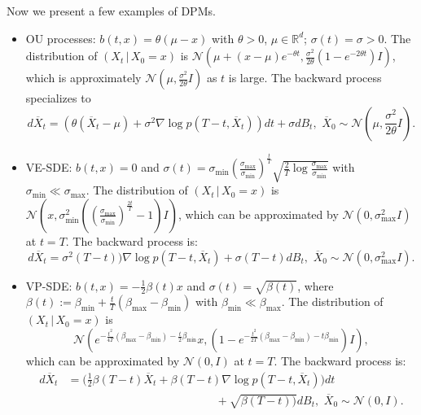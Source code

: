 \documentclass[letterpaper,11pt,reqno]{amsart}
\numberwithin{equation}{section}
\begin{document}
\quad Now we present a few examples of DPMs. 
\begin{itemize}[itemsep = 3 pt]
\item
OU processes: $b(t,x) = \theta (\mu - x)$ with $\theta > 0$, $\mu \in \mathbb{R}^d$; 
$\sigma(t) = \sigma > 0$.
The distribution of $(X_t \,|\, X_0 = x)$ is 
$\mathcal{N}(\mu + (x - \mu) e^{-\theta t}, \frac{\sigma^2}{2\theta} (1 - e^{-2 \theta t}) I)$,
which is approximately 
$\mathcal{N}(\mu, \frac{\sigma^2}{2 \theta} I)$ as $t$ is large.
The backward process specializes to
\begin{equation}
\label{eq:OUrev2}
d\overline{X}_t = (\theta(\overline{X}_t - \mu) + \sigma^2 \nabla \log p(T-t, \overline{X}_t)) dt  + \sigma dB_t, 
\,\, \overline{X}_0 \sim \mathcal{N}\left(\mu, \frac{\sigma^2}{2 \theta} I\right).
\end{equation}
\item
VE-SDE:
$b(t,x) = 0$ and 
$\sigma(t) = \sigma_{\min} \left(\frac{\sigma_{\max}}{\sigma_{\min}} \right)^{\frac{t}{T}} \sqrt{\frac{2}{T} \log \frac{\sigma_{\max}}{\sigma_{\min}}}$
with 
$\sigma_{\min} \ll  \sigma_{\max}$.
The distribution of $(X_t \,|\, X_0 = x)$ is $\mathcal{N}\left(x, \sigma^2_{\min}\left( \left(\frac{\sigma_{\max}}{\sigma_{\min}} \right)^{\frac{2t}{T}}- 1 \right) I \right)$, 
which can be approximated by $\mathcal{N}(0, \sigma^2_{\max} I)$ at $t = T$.
The backward process is:
\begin{equation}
\label{eq:VErev2}
d\overline{X}_t  = \sigma^2(T-t) ) \nabla \log p(T-t, \overline{X}_t)+  \sigma(T-t) dB_t, 
\,\, \overline{X}_0 \sim \mathcal{N}(0, \sigma^2_{\max} I).
\end{equation}
\item
VP-SDE: 
$b(t,x) = -\frac{1}{2}\beta(t) x$ and $\sigma(t) = \sqrt{\beta(t)}$,
where 
$\beta(t):= \beta_{\min} + \frac{t}{T}(\beta_{\max} - \beta_{\min})$ with $\beta_{\min} \ll \beta_{\max}$.
The distribution of $(X_t \,|\, X_0 = x)$ is
$$\mathcal{N}( e^{-\frac{t^2}{4T}(\beta_{\max} - \beta_{\min}) - \frac{t}{2} \beta_{\min}}  x,  
(1 -e^{-\frac{t^2}{2T}(\beta_{\max} - \beta_{\min}) - t \beta_{\min}} ) I),$$
which can be approximated by $\mathcal{N}(0,I)$ at $t = T$.
The backward process is:
\begin{equation}
\label{eq:VPrev2}
\begin{aligned}
d\overline{X}_t & = \bigg(\frac{1}{2} \beta(T-t) \overline{X}_t + \beta(T-t) \nabla \log p(T-t, \overline{X}_t)\bigg)  dt \\
& \qquad \qquad \qquad \qquad \qquad \qquad  \quad + \sqrt{\beta(T-t))} dB_t, \,\, \overline{X}_0 \sim \mathcal{N}(0, I).

\end{aligned}
\end{equation}
\end{itemize}
\end{document}
